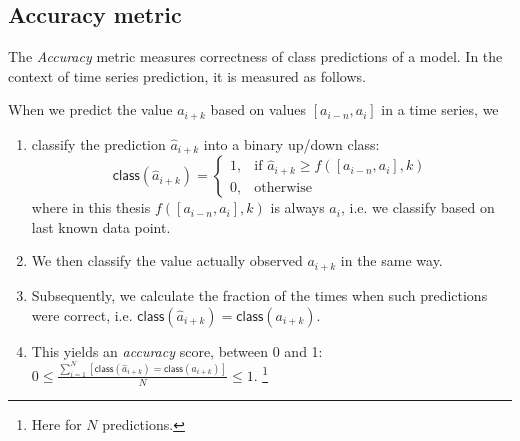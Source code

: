 \subsection{Accuracy metric}
The \emph{Accuracy}\cite{accuracy} metric measures correctness of class predictions of a model. In the context of time series prediction, it is measured as follows.

When we predict the value \(a_{i+k}\) based on values \([a_{i-n}, a_i]\) in a time series, we
\begin{enumerate}
	\item classify the prediction \(\hat{a}_{i+k}\) into a binary up/down class:
	      \[
		      \mathsf{class}(\hat{a}_{i+k}) =
		      \begin{cases}
			      1, & \text{if } \hat{a}_{i+k} \ge f([a_{i-n}, a_i], k) \\
			      0, & \text{otherwise}
		      \end{cases}
	      \]
	      where in this thesis \(f([a_{i-n}, a_i], k)\) is always \(a_i\), i.e. we classify based on last known data point.
	\item We then classify the value actually observed \(a_{i+k}\) in the same way.
	\item Subsequently, we calculate the fraction of the times when such predictions were correct, i.e. \(\mathsf{class}(\hat{a}_{i+k}) = \mathsf{class}(a_{i+k})\).
	\item This yields an \emph{accuracy} score, between 0 and 1: \(0 \leq \frac{\sum_{i=1}^N[\mathsf{class}(\hat{a}_{i+k}) = \mathsf{class}(a_{i+k})]}{N} \leq 1\). \footnote{Here for \(N\) predictions.}
\end{enumerate}

























